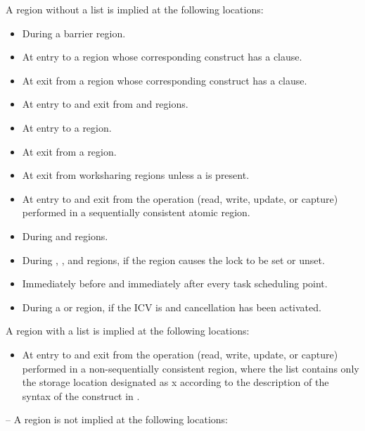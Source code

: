 A  region without a list is implied at the following locations:
\begin{itemize}
\item During a barrier region.
\item At entry to a  region whose corresponding construct has a  clause.
\item At exit from a  region whose corresponding construct has a  clause.
\item At entry to and exit from  and  regions.
\item At entry to a  region. 
\item At exit from a  region. 
\item At exit from worksharing regions unless a  is present.
\item At entry to and exit from the  operation (read, write, update, or capture) 
performed in a sequentially consistent atomic region.
\item During  and  regions.
\item During , ,  
and  regions, if the region causes the lock to be set or unset.
\item Immediately before and immediately after every task scheduling point.
\item During a  or  region, if the  ICV is  and cancellation has been activated.
\end{itemize}

A  region with a list is implied at the following locations:
\begin{itemize}
\item At entry to and exit from the  operation (read, write, update, or capture) 
performed in a non-sequentially consistent  region, where the list contains 
only the storage location designated as x according to the description of the syntax of 
the  construct in 
.
\end{itemize}

\notestart
\noteheader – A  region is not implied at the following locations:

